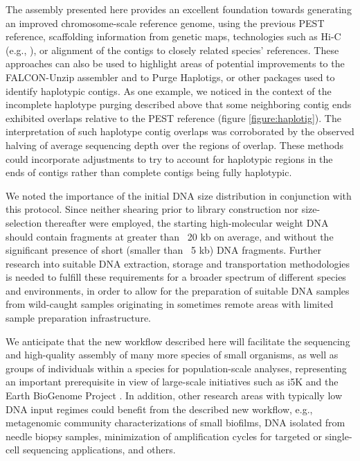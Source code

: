 \par{
The assembly presented here provides an excellent foundation towards generating an improved chromosome-scale reference genome, using the previous PEST reference, scaffolding information from genetic maps, technologies such as Hi-C (e.g., \cite{falconphase}), or alignment of the contigs to closely related species' references. These approaches can also be used to highlight areas of potential improvements to the FALCON-Unzip assembler and to Purge Haplotigs, or other packages used to identify haplotypic contigs. As one example, we noticed in the context of the incomplete haplotype purging described above that some neighboring contig ends exhibited overlaps relative to the PEST reference (figure \ref{figure:haplotig}). The interpretation of such haplotype contig overlaps was corroborated by the observed halving of average sequencing depth over the regions of overlap. These methods could incorporate adjustments to try to account for haplotypic regions in the ends of contigs rather than complete contigs being fully haplotypic.
} \\

\par{
We noted the importance of the initial DNA size distribution in conjunction with this protocol. Since neither shearing prior to library construction nor size-selection thereafter were employed, the starting high-molecular weight DNA should contain fragments at greater than ~20 kb on average, and without the significant presence of short (smaller than ~5 kb) DNA fragments. Further research into suitable DNA extraction, storage and transportation methodologies is needed to fulfill these requirements for a broader spectrum of different species and environments, in order to allow for the preparation of suitable DNA samples from wild-caught samples originating in sometimes remote areas with limited sample preparation infrastructure.
} \\
\par{
We anticipate that the new workflow described here will facilitate the sequencing and high-quality assembly of many more species of small organisms, as well as groups of individuals within a species for population-scale analyses, representing an important prerequisite in view of large-scale initiatives such as i5K and the Earth BioGenome Project \cite{EBGP}\cite{arthropoddiversity}. In addition, other research areas with typically low DNA input regimes could benefit from the described new workflow, e.g., metagenomic community characterizations of small biofilms, DNA isolated from needle biopsy samples, minimization of amplification cycles for targeted or single-cell sequencing applications, and others.
}


